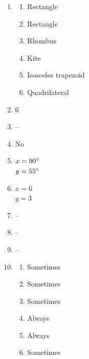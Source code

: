 \documentclass{article}
\begin{document}
\begin{enumerate}
\begin{enumerate}
	\end{enumerate}
	
\item

	\begin{enumerate}
	
	\item Rectangle
	
	\item Rectangle
	
	\item Rhombus
	
	\item Kite
	
	\item Isosceles trapezoid
	
	\item Quadrilateral
	
	\end{enumerate}
	
\item 6

\item --

\item No

\item $x = 90 \degree$ \\
	$y = 55 \degree$
	
\item $x = 6$ \\
	$y = 3$
	
\item --

\item --

\item --

\item 

	\begin{enumerate}
	
	\item Sometimes
	
	\item Sometimes
	
	\item Sometimes
	
	\item Always
	
	\item Always
	
	\item Sometimes
	

\end{enumerate}
\end{enumerate}
\end{document}
